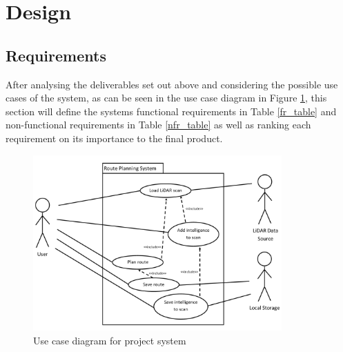 \documentclass[12pt,a4paper]{article}
\begin{document}
\section{Design}

  \subsection{Requirements}
  \noindent After analysing the deliverables set out above and considering the possible use cases of the system, as can be seen in the use case diagram in Figure \ref{use_case_diagram_fig}, this section will define the system\textquotesingle s functional requirements in Table \ref{fr_table} and non-functional requirements in Table \ref{nfr_table} as well as ranking each requirement on its importance to the final product.

  \begin{figure}
    \centering
    \includegraphics[width=0.85\textwidth]{use_case_diagram}
    \caption{Use case diagram for project system}
    \label{use_case_diagram_fig}
  \end{figure}
\end{document}
